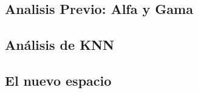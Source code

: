 \subsection{Analisis Previo: Alfa y Gama}


\newpage
\subsection{Análisis de KNN}


\newpage
\subsection{El nuevo espacio}

